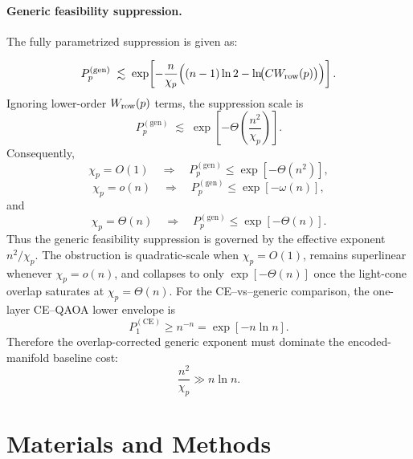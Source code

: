 \documentclass[a4paper,onecolumn,11pt,unpublished]{quantumarticle}
\theoremstyle{remark}
\begin{document}
\paragraph{Generic feasibility suppression.} The fully parametrized suppression is given as:



\[
  P_p^{(\mathrm{gen})}
  \;\lesssim\;
  \exp\!\left[
    -\frac{n}{\chi_p}
    \Bigl((n-1)\ln 2-\ln\!\bigl(CW_{\rm row}(p)\bigr)\Bigr)
  \right].
\]
Ignoring lower-order \(W_{\rm row}(p)\) terms, the suppression scale is
\[
  P_p^{(\mathrm{gen})}
  \;\lesssim\;
  \exp\!\left[
    -\Theta\!\left(\frac{n^2}{\chi_p}\right)
  \right].
\]
Consequently,
\[
  \chi_p=O(1)
  \quad\Longrightarrow\quad
  P_p^{(\mathrm{gen})}
  \le
  \exp[-\Theta(n^2)],
\]
\[
  \chi_p=o(n)
  \quad\Longrightarrow\quad
  P_p^{(\mathrm{gen})}
  \le
  \exp[-\omega(n)],
\]
and
\[
  \chi_p=\Theta(n)
  \quad\Longrightarrow\quad
  P_p^{(\mathrm{gen})}
  \le
  \exp[-\Theta(n)].
\]
Thus the generic feasibility suppression is governed by the effective
exponent \(n^2/\chi_p\).  The obstruction is quadratic-scale when
\(\chi_p=O(1)\), remains superlinear whenever \(\chi_p=o(n)\), and collapses
to only \(\exp[-\Theta(n)]\) once the light-cone overlap saturates at
\(\chi_p=\Theta(n)\).
For the CE--vs--generic comparison, the one-layer CE--QAOA lower envelope is
\[
  P_1^{(\mathrm{CE})}
  \ge
  n^{-n}
  =
  \exp[-n\ln n].
\]
Therefore the overlap-corrected generic exponent must dominate the
encoded-manifold baseline cost:
\[
  \frac{n^2}{\chi_p}
  \gg
  n\ln n.
\]








\section{Materials and Methods}
\label{sec:methods}
\end{document}
